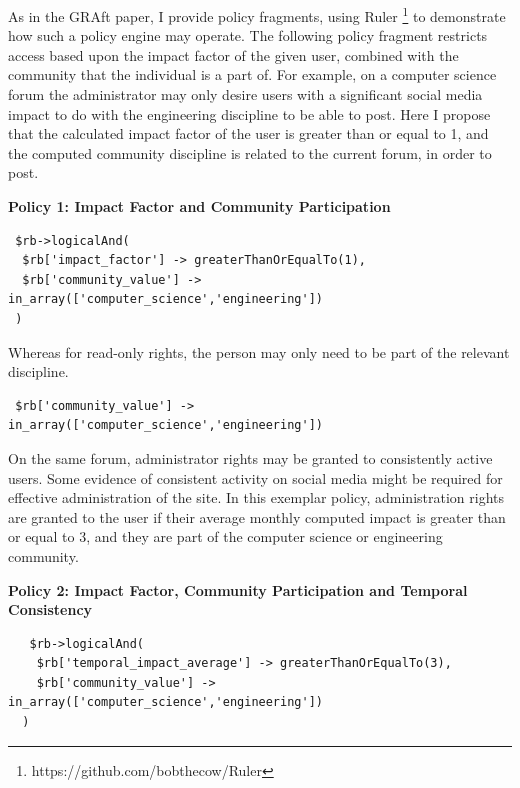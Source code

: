 As in the GRAft paper, I provide policy fragments, using Ruler \footnote{https://github.com/bobthecow/Ruler} to demonstrate how such a policy engine may operate. The following policy fragment restricts access based upon the impact factor of the given user, combined with the community that the individual is a part of. For example, on a computer science forum the administrator may only desire users with a significant social media impact to do with the engineering discipline to be able to post. Here I propose that the calculated impact factor of the user is greater than or equal to 1, and the computed community discipline is related to the current forum, in order to post. 

\begin{center}
 \textbf{Policy 1: Impact Factor and Community Participation}
\begin{verbatim} 
 $rb->logicalAnd(
  $rb['impact_factor'] -> greaterThanOrEqualTo(1),
  $rb['community_value'] -> in_array(['computer_science','engineering'])
 ) 
\end{verbatim}
\end{center}

Whereas for read-only rights, the person may only need to be part of the relevant discipline.

\begin{verbatim}
 $rb['community_value'] -> in_array(['computer_science','engineering'])
\end{verbatim}

On the same forum, administrator rights may be granted to consistently active users. Some evidence of consistent activity on social media might be required for effective administration of the site. In this exemplar policy, administration rights are granted to the user if their average monthly computed impact is greater than or equal to 3, and they are part of the computer science or engineering community. 

\begin{center}
 \textbf{Policy 2: Impact Factor, Community Participation and Temporal Consistency}
 \begin{verbatim}
   $rb->logicalAnd(
    $rb['temporal_impact_average'] -> greaterThanOrEqualTo(3),
    $rb['community_value'] -> in_array(['computer_science','engineering'])
  ) 
 \end{verbatim}
\end{center}




